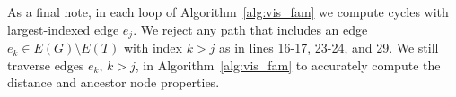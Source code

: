\documentclass[fleqn,11pt]{article}
\begin{document}
\begin{itemize}
\end{itemize}

As a final note, in each loop of Algorithm~\ref{alg:vis_fam} we compute cycles with largest-indexed edge $e_j$. We reject any path that includes an edge $e_k\in E(G)\setminus E(T)$ with index $k>j$ as in lines 16-17, 23-24, and 29. We still traverse edges $e_k$, $k>j$, in Algorithm~\ref{alg:vis_fam} to accurately compute the distance and ancestor node properties.
\end{document}
